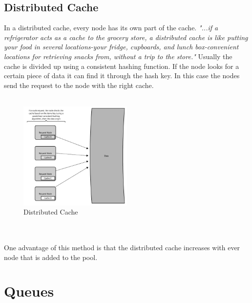 \documentclass[12p]{article}
\begin{document}
	\subsection{Distributed Cache}
	In a distributed cache, every node has its own part of the cache. \textit{"...if a refrigerator acts as a cache to the grocery store, a distributed cache is like putting your food in several locations-your fridge, cupboards, and lunch box-convenient locations for retrieving snacks from, without a trip to the store."}\cite{cache} Usually the cache is divided up using a consistent hashing function. If the node looks for a certain piece of data it can find it through the hash key. In this case the nodes send the request to the node with the right cache.\\\\
	 	\begin{figure}[h!]
	 		\centering
	 		\includegraphics[width=0.5\textwidth]{img/distrib}
	 		\caption{Distributed Cache\cite{cache}}
	 	\end{figure}
	 	\\\\
	One advantage of this method is that the distributed cache increases with ever node that is added to the pool.
	
	\newpage
	\section{Queues}
	
\end{document}
